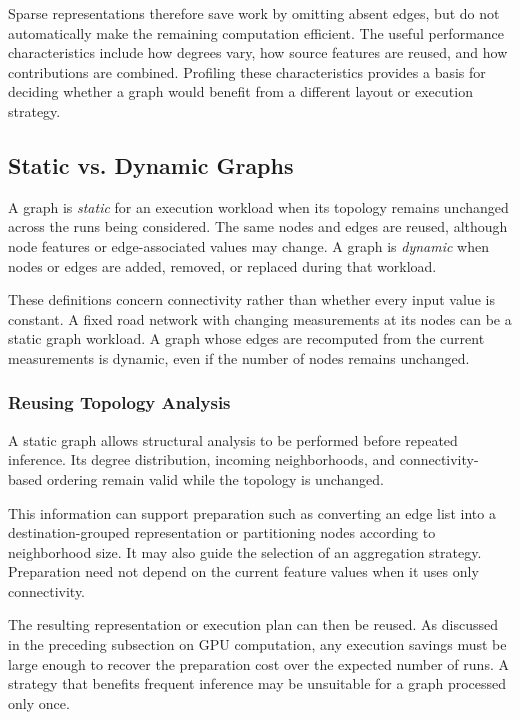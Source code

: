 Sparse representations therefore save work by omitting absent edges, but do not automatically make the remaining computation efficient. The useful performance characteristics include how degrees vary, how source features are reused, and how contributions are combined. Profiling these characteristics provides a basis for deciding whether a graph would benefit from a different layout or execution strategy.

\subsection{Static vs. Dynamic Graphs}
\label{sec:static-vs-dynamic-graphs}

A graph is \emph{static} for an execution workload when its topology remains unchanged across the runs being considered. The same nodes and edges are reused, although node features or edge-associated values may change. A graph is \emph{dynamic} when nodes or edges are added, removed, or replaced during that workload.

These definitions concern connectivity rather than whether every input value is constant. A fixed road network with changing measurements at its nodes can be a static graph workload. A graph whose edges are recomputed from the current measurements is dynamic, even if the number of nodes remains unchanged.

\subsubsection{Reusing Topology Analysis}

A static graph allows structural analysis to be performed before repeated inference. Its degree distribution, incoming neighborhoods, and connectivity-based ordering remain valid while the topology is unchanged.

This information can support preparation such as converting an edge list into a destination-grouped representation or partitioning nodes according to neighborhood size. It may also guide the selection of an aggregation strategy. Preparation need not depend on the current feature values when it uses only connectivity.

The resulting representation or execution plan can then be reused. As discussed in the preceding subsection on GPU computation, any execution savings must be large enough to recover the preparation cost over the expected number of runs. A strategy that benefits frequent inference may be unsuitable for a graph processed only once.

